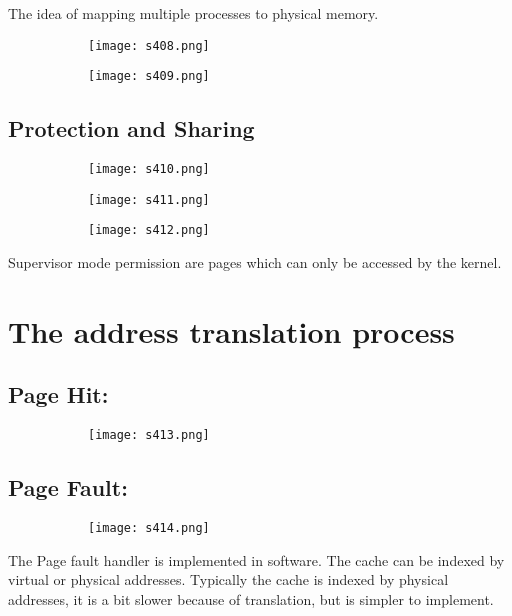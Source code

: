 \documentclass[8pt]{extreport}
\begin{document}
The idea of mapping multiple processes to physical memory.
\begin{figure}[H]
\begin{subfigure}[b]{0.4\linewidth}
\texttt{[image: s408.png]}
\end{subfigure}
\begin{subfigure}[b]{0.4\linewidth}
\texttt{[image: s409.png]}
\end{subfigure}
\end{figure}

\subsection{Protection and Sharing}
\begin{figure}[H]
\begin{subfigure}[b]{0.4\linewidth}
\texttt{[image: s410.png]}
\end{subfigure}
\begin{subfigure}[b]{0.4\linewidth}
\texttt{[image: s411.png]}
\end{subfigure}
\begin{subfigure}[b]{0.4\linewidth}
\texttt{[image: s412.png]}
\end{subfigure}
\end{figure}
Supervisor mode permission are pages which can only be accessed by the kernel.

\section{The address translation process}

\subsection{Page Hit:}
\begin{figure}[H]
\begin{subfigure}[b]{0.4\linewidth}
\texttt{[image: s413.png]}
\end{subfigure}
\end{figure}
\subsection{Page Fault:}
\begin{figure}[H]
\begin{subfigure}[b]{0.4\linewidth}
\texttt{[image: s414.png]}
\end{subfigure}
\end{figure}
The Page fault handler is implemented in software. The cache can be indexed by virtual or physical addresses. Typically the cache is indexed by physical addresses, it is a bit slower because of translation, but is simpler to implement.
\end{document}
